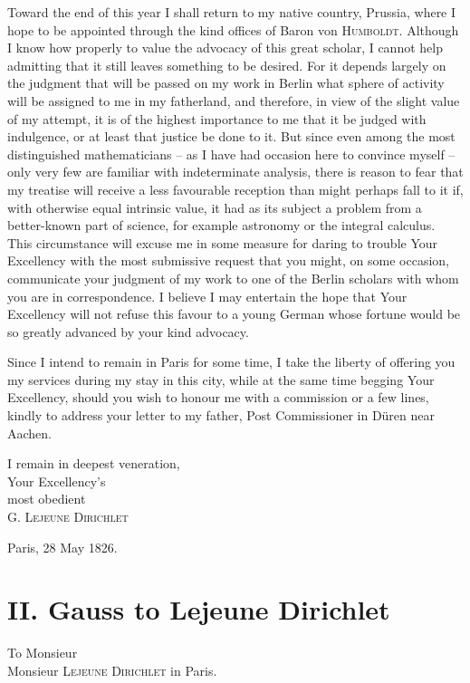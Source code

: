 \documentclass[11pt]{article}
\newcommand{\scn}[1]{\textsc{#1}}
\begin{document}
Toward the end of this year I shall return to my native country, Prussia, where I hope to be appointed through the kind offices of Baron von \scn{Humboldt}. Although I know how properly to value the advocacy of this great scholar, I cannot help admitting that it still leaves something to be desired. For it depends largely on the judgment that will be passed on my work in Berlin what sphere of activity will be assigned to me in my fatherland, and therefore, in view of the slight value of my attempt, it is of the highest importance to me that it be judged with indulgence, or at least that justice be done to it. But since even among the most distinguished mathematicians -- as I have had occasion here to convince myself -- only very few are familiar with indeterminate analysis, there is reason to fear that my treatise will receive a less favourable reception than might perhaps fall to it if, with otherwise equal intrinsic value, it had as its subject a problem from a better-known part of science, for example astronomy or the integral calculus. This circumstance will excuse me in some measure for daring to trouble Your Excellency with the most submissive request that you might, on some occasion, communicate your judgment of my work to one of the Berlin scholars with whom you are in correspondence. I believe I may entertain the hope that Your Excellency will not refuse this favour to a young German whose fortune would be so greatly advanced by your kind advocacy.

Since I intend to remain in Paris for some time, I take the liberty of offering you my services during my stay in this city, while at the same time begging Your Excellency, should you wish to honour me with a commission or a few lines, kindly to address your letter to my father, Post Commissioner in Düren near Aachen.

\begin{flushright}
I remain in deepest veneration,\\[0.4em]
Your Excellency's\\
most obedient\\
\scn{G. Lejeune Dirichlet}
\end{flushright}
Paris, 28 May 1826.

\section*{II. Gauss to Lejeune Dirichlet}
\begin{flushleft}
To Monsieur\\
\hspace*{2em}Monsieur \scn{Lejeune Dirichlet} in Paris.
\end{flushleft}
\end{document}
